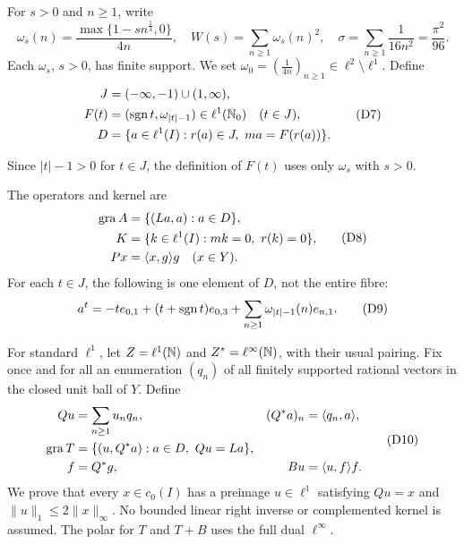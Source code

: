 For $s>0$ and $n\ge1$, write
\begin{equation}
\omega_s(n)=\frac{\max\{1-sn^{\frac{1}{4}},0\}}{4n},\quad
W(s)=\sum_{n\ge1}\omega_s(n)^2,\quad
\sigma=\sum_{n\ge1}\frac1{16n^2}=\frac{\pi^2}{96}.
\tag{D6}\label{eq:D6}
\end{equation}
Each $\omega_s$, $s>0$, has finite support. We set
$\omega_0=(\frac{1}{4n})_{n\ge1}\in\ell^2\setminus\ell^1$. Define
\begin{equation}
\begin{aligned}
J&=(-\infty,-1)\cup(1,\infty),\\
F(t)&=(\operatorname{sgn} t,\omega_{|t|-1})\in\ell^1(\mathbb N_0)\quad(t\in J),\\
D&=\{a\in\ell^1(I):r(a)\in J,\ ma=F(r(a))\}.
\end{aligned}
\tag{D7}\label{eq:D7}
\end{equation}

Since $|t|-1>0$ for $t\in J$, the definition of $F(t)$ uses only
$\omega_s$ with $s>0$.

The operators and kernel are
\begin{equation}
\begin{aligned}
\operatorname{gra} A&=\{(La,a):a\in D\},\\
K&=\{k\in\ell^1(I):mk=0,\ r(k)=0\},\\
Px&=\langle x,g\rangle g\quad(x\in Y).
\end{aligned}
\tag{D8}\label{eq:D8}
\end{equation}
For each $t\in J$, the following is one element of $D$, not the entire fibre:
\begin{equation}
a^t=-t e_{0,1}+(t+\operatorname{sgn} t)e_{0,3}
       +\sum_{n\ge1}\omega_{|t|-1}(n)e_{n,1}.
\tag{D9}\label{eq:D9}
\end{equation}


For standard $\ell^1$, let $Z=\ell^1(\mathbb N)$ and $Z^*=\ell^\infty(\mathbb N)$,
with their usual pairing. Fix once and for all an enumeration $(q_n)$ of
all finitely supported rational vectors in the closed unit ball of $Y$.
Define
\begin{equation}
\begin{aligned}
Qu&=\sum_{n\ge1}u_nq_n,& (Q^*a)_n&=\langle q_n,a\rangle,\\
\operatorname{gra} T&=\{(u,Q^*a):a\in D,\ Qu=La\},\\
f&=Q^*g,& Bu&=\langle u,f\rangle f.
\end{aligned}
\tag{D10}\label{eq:D10}
\end{equation}
We prove that every $x\in c_0(I)$ has a preimage $u\in\ell^1$ satisfying
$Qu=x$ and $\|u\|_1\le2\|x\|_\infty$. No bounded linear right inverse or
complemented kernel is assumed. The polar for $T$ and $T+B$ uses the full
dual $\ell^\infty$.


